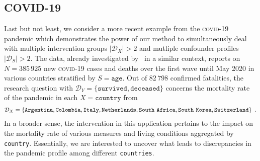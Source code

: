 \documentclass[10pt]{article}
\newcommand{\equ}[1]{\begin{gather} #1 \end{gather}}
\begin{document}
\subsection{COVID-19}
\label{ssc:COVID19}

Last but not least, we consider a more recent example from the \textsc{covid}-19 pandemic which demonstrates the power of our method to simultaneously  deal with multiple intervention groups $\vert\mathcal D_X\vert>2$ and mutliple confounder profiles $\vert\mathcal D_S\vert>2$. 
The data, already investigated by~\cite{9404149} in a similar context,  reports on $N=385\,925$ new \textsc{covid}-19 cases and deaths over the first wave until May 2020 in various countries stratified by $S=\texttt{age}$.
Out of $82\,798$ confirmed fatalities, the research question with $\mathcal D_Y=\{\texttt{survived},\texttt{deceased}\}$ concerns the mortality rate  %
of the pandemic in each $X=\texttt{country}$ from
\equ{
\mathcal D_X = \left\{\texttt{Argentina},\texttt{Colombia}, \texttt{Italy},\texttt{Netherlands},\texttt{South\,\,Africa},\texttt{South\,\,Korea},\texttt{Switzerland} \right\}
~.
}
In a broader sense, the intervention in this application
pertains to the impact on the {mortality} rate of  various measures and living conditions aggregated by \texttt{country}. Essentially, we are interested to uncover what leads to discrepancies in the pandemic profile  among different \texttt{countries}.
\end{document}

